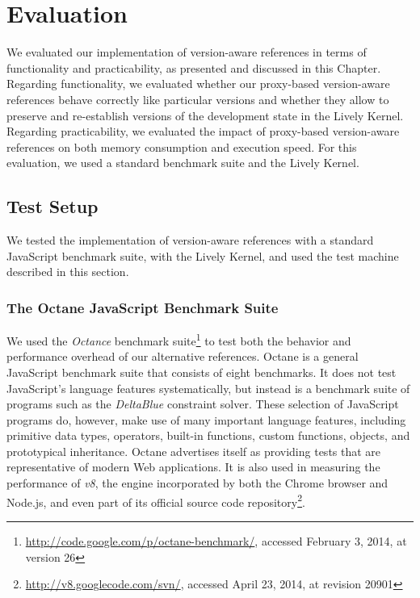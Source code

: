 \chapter{Evaluation} \label{chapter:EVALUATION}

We evaluated our implementation of version-aware references in terms of functionality and practicability, as presented and discussed in this Chapter.
Regarding functionality, we evaluated whether our proxy-based version-aware references behave correctly like particular versions and whether they allow to preserve and re-establish versions of the development state in the Lively Kernel.
Regarding practicability, we evaluated the impact of proxy-based version-aware references on both memory consumption and execution speed.
For this evaluation, we used a standard benchmark suite and the Lively Kernel.


\section{Test Setup}

We tested the implementation of version-aware references with a standard JavaScript benchmark suite, with the Lively Kernel, and used the test machine described in this section.


\subsection{The Octane JavaScript Benchmark Suite}

We used the \emph{Octance} benchmark suite\footnote{\url{http://code.google.com/p/octane-benchmark/}, accessed February 3, 2014, at version 26} to test both the behavior and performance overhead of our alternative references.
Octane is a general JavaScript benchmark suite that consists of eight benchmarks.
It does not test JavaScript's language features systematically, but instead is a benchmark suite of programs such as the \emph{DeltaBlue}\cite{FreemanBenson1990ICS} constraint solver.
These selection of JavaScript programs do, however, make use of many important language features, including primitive data types, operators, built-in functions, custom functions, objects, and prototypical inheritance.
Octane advertises itself as providing tests that are representative of modern Web applications.
It is also used in measuring the performance of \emph{v8}, the engine incorporated by both the Chrome browser and Node.js, and even part of its official source code repository\footnote{\url{http://v8.googlecode.com/svn/}, accessed April 23, 2014, at revision 20901}.

